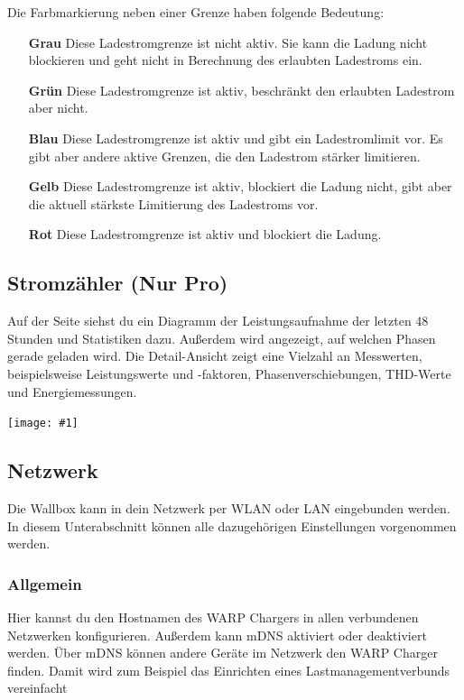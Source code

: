 \documentclass[a4paper,10pt]{article}
\newcommand{\gfx}[1]{\texttt{[image: \#1]}}
\begin{document}
\begin{multicols*}{2}
	Die Farbmarkierung neben einer Grenze haben folgende Bedeutung:
	\begin{itemize}
	 \item[\textbf{\textcolor{mygray}{Grau}}] Diese Ladestromgrenze ist nicht aktiv. Sie kann die Ladung nicht blockieren und geht nicht in Berechnung des erlaubten Ladestroms ein.
	 \item[\textbf{\textcolor{mygreen}{Grün}}] Diese Ladestromgrenze ist aktiv, beschränkt den erlaubten Ladestrom aber nicht.
	 \item[\textbf{\textcolor{myblue}{Blau}}] Diese Ladestromgrenze ist aktiv und gibt ein Ladestromlimit vor. Es gibt aber andere aktive Grenzen, die den Ladestrom stärker limitieren.
	 \item[\textbf{\textcolor{myorange}{Gelb}}] Diese Ladestromgrenze ist aktiv, blockiert die Ladung nicht, gibt aber die aktuell stärkste Limitierung des Ladestroms vor.
	 \item[\textbf{\textcolor{myred}{Rot}}] Diese Ladestromgrenze ist aktiv und blockiert die Ladung.
	\end{itemize}

	\subsection{Stromzähler (Nur Pro)}
	Auf der Seite siehst du ein Diagramm der Leistungsaufnahme der letzten 48 Stunden und Statistiken dazu.
	Außerdem wird angezeigt, auf welchen Phasen gerade geladen wird.
	Die Detail-Ansicht zeigt eine Vielzahl an Messwerten, beispielsweise Leistungswerte und -faktoren,
	Phasenverschiebungen, THD-Werte und Energiemessungen.

	\gfx{./img_warp2/resized/web_meter}

	\newpage

	\subsection{Netzwerk}\label{network}
	Die Wallbox kann in dein Netzwerk per WLAN oder LAN eingebunden werden.
	In diesem Unterabschnitt können alle dazugehörigen Einstellungen vorgenommen werden.

	\subsubsection{Allgemein}
	Hier kannst du den Hostnamen des WARP Chargers in allen verbundenen Netzwerken konfigurieren. Außerdem kann mDNS aktiviert oder deaktiviert werden.
	Über mDNS können andere Geräte im Netzwerk den WARP Charger finden. Damit wird zum Beispiel das Einrichten eines Lastmanagementverbunds vereinfacht


\end{multicols*}
\end{document}
